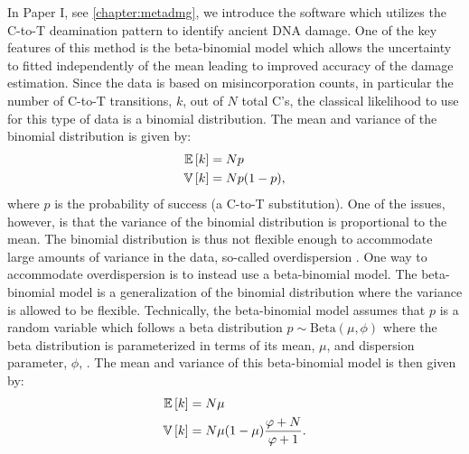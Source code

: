 In Paper I, see \autoref{chapter:metadmg}, we introduce the \metaDMG  software which utilizes the C-to-T deamination pattern to identify ancient DNA damage. One of the key features of this method is the beta-binomial model which allows the uncertainty to fitted independently of the mean leading to improved accuracy of the damage estimation. Since the data is based on misincorporation counts, in particular the number of C-to-T transitions, $k$, out of $N$ total C's, the classical likelihood to use for this type of data is a binomial distribution. The mean and variance of the binomial distribution is given by:
\begin{equation}
    \begin{split}
        \mathbb{E}\left[{k}\right]  &= N p \\
        \mathbb{V}\left[{k}\right] &= Np(1-p),
        \label{eq:Binomial_expectation_variance}
    \end{split}
\end{equation}
where $p$ is the probability of success (a C-to-T substitution). One of the issues, however, is that the variance of the binomial distribution is proportional to the mean. The binomial distribution is thus not flexible enough to accommodate large amounts of variance in the data, so-called overdispersion \autocite{mcelreathStatisticalRethinkingBayesian2020}. One way to accommodate overdispersion is to instead use a beta-binomial model. The beta-binomial model is a generalization of the binomial distribution where the variance is allowed to be flexible. Technically, the beta-binomial model assumes that $p$ is a random variable which follows a beta distribution $p \sim \mathrm{Beta}(\mu, \phi)$ where the beta distribution is parameterized in terms of its mean, $\mu$, and dispersion parameter, $\phi$, \autocite{cepeda-cuervoDoubleGeneralizedBetaBinomial2017}. The mean and variance of this beta-binomial model is then given by:
\begin{equation}
    \begin{split}
        \mathbb{E}\left[{k}\right]  &= N \mu \\
        \mathbb{V}\left[{k}\right] &= N\mu(1-\mu) \frac{\varphi+N}{\varphi+1}.
        \label{eq:BetaBinomial_expectation_variance}
    \end{split}
\end{equation}

